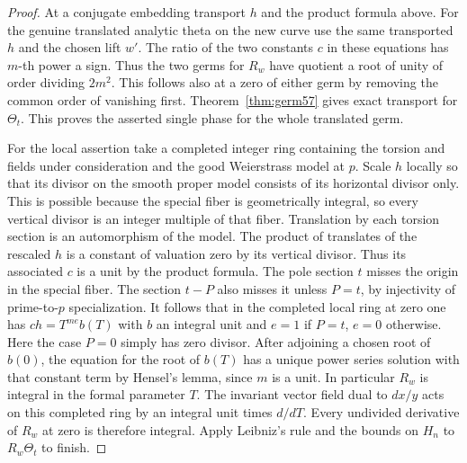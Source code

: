 \documentclass[a4paper,11pt]{article}
\theoremstyle{definition}
\theoremstyle{remark}
\numberwithin{equation}{section}
\begin{document}
\begin{proof}
At a conjugate embedding transport \(h\) and the product formula
above. For the genuine translated analytic theta on the new curve
use the same transported \(h\) and the chosen lift \(w'\).
The ratio of the two constants \(c\) in these equations has
\(m\)-th power a sign. Thus the two germs for \(R_w\) have
quotient a root of unity of order dividing \(2m^2\). This follows
also at a zero of either germ by removing the common order of
vanishing first. Theorem~\ref{thm:germ57} gives exact transport
for \(\Theta_t\). This proves the asserted single phase for the
whole translated germ.

For the local assertion take a completed integer ring containing
the torsion and fields under consideration and the good Weierstrass
model at \(p\). Scale \(h\) locally so that its divisor on the
smooth proper model consists of its horizontal divisor only.
This is possible because the special fiber is geometrically
integral, so every vertical divisor is an integer multiple of
that fiber. Translation by each torsion section is an automorphism
of the model. The product of translates of the rescaled \(h\) is
a constant of valuation zero by its vertical divisor. Thus its
associated \(c\) is a unit by the product formula. The pole
section \(t\) misses the origin in the special fiber. The section
\(t-P\) also misses it unless \(P=t\), by injectivity of
prime-to-\(p\) specialization. It follows that in the completed
local ring at zero one has \(c h=T^{m e}b(T)\) with \(b\) an
integral unit and \(e=1\) if \(P=t\), \(e=0\) otherwise.
Here the case \(P=0\) simply has zero divisor. After adjoining a
chosen root of \(b(0)\), the equation for the root of \(b(T)\)
has a unique power series solution with that constant term by
Hensel's lemma, since \(m\) is a unit. In particular \(R_w\) is
integral in the formal parameter \(T\). The invariant vector
field dual to \(dx/y\) acts on this completed ring by an integral
unit times \(d/dT\). Every undivided derivative of \(R_w\) at
zero is therefore integral. Apply Leibniz's rule and the bounds
on \(H_n\) to \(R_w\Theta_t\) to finish.
\end{proof}
\end{document}

